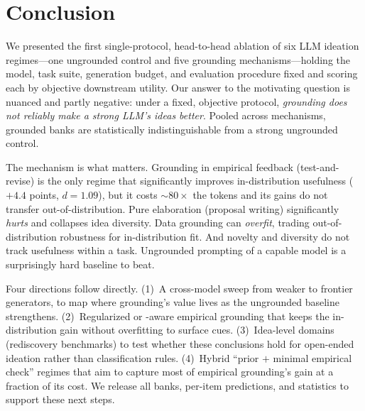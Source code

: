 \section{Conclusion}
\label{sec:conclusion}

We presented the first single-protocol, head-to-head ablation of six LLM ideation
regimes---one ungrounded control and five grounding mechanisms---holding the model,
task suite, generation budget, and evaluation procedure fixed and scoring each by
objective downstream utility. Our answer to the motivating question is nuanced and
partly negative: under a fixed, objective protocol, \emph{grounding does not reliably
make a strong LLM's ideas better}. Pooled across mechanisms, grounded banks are
statistically indistinguishable from a strong ungrounded control.

 The mechanism is what matters. Grounding in empirical feedback
(test-and-revise) is the only regime that significantly improves in-distribution
usefulness ($+4.4$ points, $d{=}1.09$), but it costs $\sim\!80\times$ the tokens and
its gains do not transfer out-of-distribution. Pure elaboration (proposal writing)
significantly \emph{hurts} and collapses idea diversity. Data grounding can
\emph{overfit}, trading out-of-distribution robustness for in-distribution fit. And
novelty and diversity do not track usefulness within a task. Ungrounded prompting of
a capable model is a surprisingly hard baseline to beat.

 Four directions follow directly. (1)~A cross-model sweep from
weaker to frontier generators, to map where grounding's value lives as the ungrounded
baseline strengthens. (2)~Regularized or \OOD-aware empirical grounding that keeps the
in-distribution gain without overfitting to surface cues. (3)~Idea-level domains
(\eg rediscovery benchmarks) to test whether these conclusions hold for open-ended
ideation rather than classification rules. (4)~Hybrid ``prior $+$ minimal empirical
check'' regimes that aim to capture most of empirical grounding's gain at a fraction
of its cost. We release all banks, per-item predictions, and statistics to support
these next steps.
